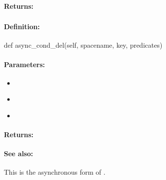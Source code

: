 \paragraph{Returns:}


\pagebreak
\subsubsection{}
\label{api:python:async_cond_del}


\paragraph{Definition:}
\begin{pythoncode}
def async_cond_del(self, spacename, key, predicates)
\end{pythoncode}

\paragraph{Parameters:}
\begin{itemize}[noitemsep]
\item {}\\

\item {}\\

\item {}\\

\end{itemize}

\paragraph{Returns:}


\paragraph{See also:}  This is the asynchronous form of .

\pagebreak
\subsubsection{}
\label{api:python:group_del}


